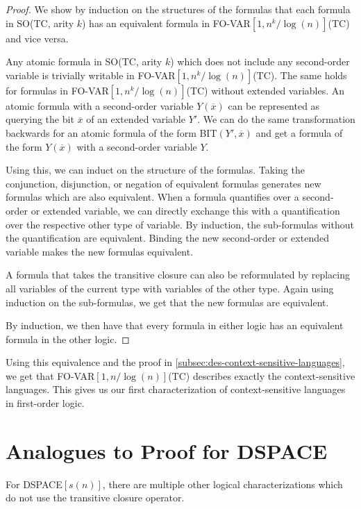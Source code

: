 \begin{proof}
    We show by induction on the structures of the formulas that each formula in SO(TC, arity $k$) has an equivalent formula in FO-VAR$[1, n^k/\log(n)]$(TC) and vice versa.

    Any atomic formula in SO(TC, arity $k$) which does not include any second-order variable is trivially writable in FO-VAR$[1, n^k/\log(n)]$(TC).
    The same holds for formulas in FO-VAR$[1, n^k/\log(n)]$(TC) without extended variables.
    An atomic formula with a second-order variable $Y(\overline{x})$ can be represented as querying the bit $\overline{x}$ of an extended variable $Y'$.
    We can do the same transformation backwards for an atomic formula of the form BIT$(Y', \overline{x})$ and get a formula of the form $Y(\overline{x})$ with a second-order variable $Y$.

    Using this, we can induct on the structure of the formulas.
    Taking the conjunction, disjunction, or negation of equivalent formulas generates new formulas which are also equivalent.
    When a formula quantifies over a second-order or extended variable, we can directly exchange this with a quantification over the respective other type of variable.
    By induction, the sub-formulas without the quantification are equivalent.
    Binding the new second-order or extended variable makes the new formulas equivalent.

    A formula that takes the transitive closure can also be reformulated by replacing all variables of the current type with variables of the other type.
    Again using induction on the sub-formulas, we get that the new formulas are equivalent.

    By induction, we then have that every formula in either logic has an equivalent formula in the other logic.
\end{proof}

Using this equivalence and the proof in \cref{subsec:des-context-sensitive-languages}, we get that FO-VAR$[1, n/\log(n)]$(TC) describes exactly the context-sensitive languages.
This gives us our first characterization of context-sensitive languages in first-order logic.


\section{Analogues to Proof for DSPACE}\label{sec:analogues-to-proof-for-dspace}

For DSPACE$[s(n)]$, there are multiple other logical characterizations which do not use the transitive closure operator.

